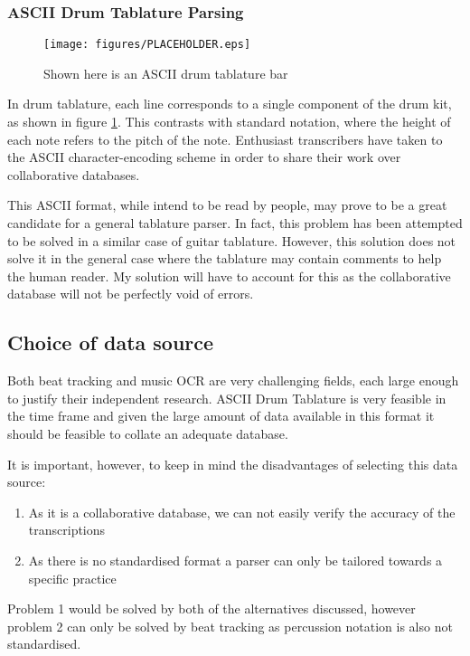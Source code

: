 \documentclass[12pt,twoside,notitlepage]{report}
\begin{document}
			\subsubsection{ASCII Drum Tablature Parsing}
						\begin{figure}[h]
			\centerline{\texttt{[image: figures/PLACEHOLDER.eps]}}
			\caption{\label{DrumTablature} Shown here is an ASCII drum tablature bar}
\end{figure}
				In drum tablature, each line corresponds to a single component of the drum kit, as shown in figure \ref{DrumTablature}. This contrasts with standard notation, where the height of each note refers to the pitch of the note. Enthusiast transcribers have taken to the ASCII character-encoding scheme in order to share their work over collaborative databases\footnotemark {}.
				
				This ASCII format, while intend to be read by people, may prove to be a great candidate for a general tablature parser. In fact, this problem has been attempted to be solved in a similar case of guitar tablature\cite{Knowles2013}. However, this solution does not solve it in the general case where the tablature may contain comments to help the human reader. My solution will have to account for this as the collaborative database will not be perfectly void of errors.
		\subsection{\label{subsec:ChoiceOfDataSource}Choice of data source}
		Both beat tracking and music OCR are very challenging fields, each large enough to justify their independent research. ASCII Drum Tablature is very feasible in the time frame and given the large amount of data available in this format it should be feasible to collate an adequate database.
		
		It is important, however, to keep in mind the disadvantages of selecting this data source:
		\begin{enumerate}
			\item{As it is a collaborative database, we can not easily verify the accuracy of the transcriptions}
			\item{As there is no standardised format a parser can only be tailored towards a specific practice}
		\end{enumerate}
		
		Problem 1 would be solved by both of the alternatives discussed, however problem 2 can only be solved by beat tracking as percussion notation is also not standardised. 
		
\end{document}
